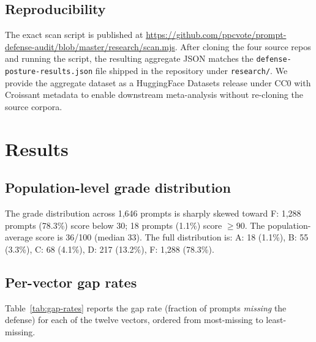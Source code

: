 \documentclass[10pt,letterpaper]{article}
\begin{document}
\subsection{Reproducibility}
The exact scan script is published at
\url{https://github.com/ppcvote/prompt-defense-audit/blob/master/research/scan.mjs}.
After cloning the four source repos and running the script, the
resulting aggregate JSON matches the
\texttt{defense-posture-results.json} file shipped in the repository
under \texttt{research/}. We provide the aggregate dataset as a
HuggingFace Datasets release under CC0 with Croissant metadata to
enable downstream meta-analysis without re-cloning the source
corpora.

\section{Results}\label{sec:results}

\subsection{Population-level grade distribution}
The grade distribution across 1{,}646 prompts is sharply skewed
toward F: 1{,}288 prompts (78.3\%) score below 30; 18 prompts (1.1\%)
score $\geq 90$. The population-average score is 36/100 (median 33).
The full distribution is:
A: 18 (1.1\%), B: 55 (3.3\%), C: 68 (4.1\%), D: 217 (13.2\%),
F: 1{,}288 (78.3\%).

\subsection{Per-vector gap rates}
Table~\ref{tab:gap-rates} reports the gap rate (fraction of prompts
\emph{missing} the defense) for each of the twelve vectors, ordered
from most-missing to least-missing.
\end{document}
